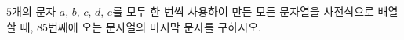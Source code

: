 $5$개의 문자 $a$, $b$, $c$, $d$, $e$를 모두 한 번씩 사용하여 만든 모든 문자열을 사전식으로 배열할 때, $85$번째에 오는 문자열의 마지막 문자를 구하시오.
